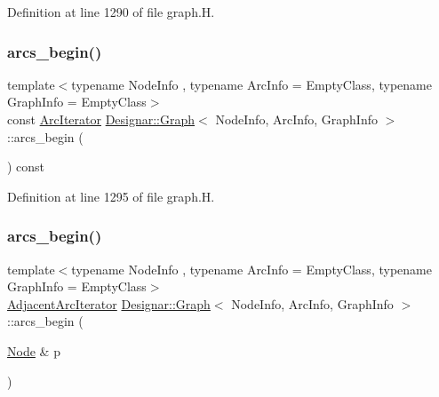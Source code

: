 Definition at line 1290 of file graph.\+H.

\mbox{\label{class_designar_1_1_graph_a3906cae09045bb9c037e1c3c4e64dd97}} 
\subsubsection{\texorpdfstring{arcs\+\_\+begin()}{arcs\_begin()}\hspace{0.1cm}{\footnotesize\ttfamily [2/4]}}
{\footnotesize\ttfamily template$<$typename Node\+Info , typename Arc\+Info  = Empty\+Class, typename Graph\+Info  = Empty\+Class$>$ \\
const \hyperlink{class_designar_1_1_graph_1_1_arc_iterator}{Arc\+Iterator} \hyperlink{class_designar_1_1_graph}{Designar\+::\+Graph}$<$ Node\+Info, Arc\+Info, Graph\+Info $>$\+::arcs\+\_\+begin (\begin{DoxyParamCaption}{ }\end{DoxyParamCaption}) const\hspace{0.3cm}{\ttfamily [inline]}}



Definition at line 1295 of file graph.\+H.

\mbox{\label{class_designar_1_1_graph_a9488f4193d227a690f46e91a11dd830a}} 
\subsubsection{\texorpdfstring{arcs\+\_\+begin()}{arcs\_begin()}\hspace{0.1cm}{\footnotesize\ttfamily [3/4]}}
{\footnotesize\ttfamily template$<$typename Node\+Info , typename Arc\+Info  = Empty\+Class, typename Graph\+Info  = Empty\+Class$>$ \\
\hyperlink{class_designar_1_1_graph_1_1_adjacent_arc_iterator}{Adjacent\+Arc\+Iterator} \hyperlink{class_designar_1_1_graph}{Designar\+::\+Graph}$<$ Node\+Info, Arc\+Info, Graph\+Info $>$\+::arcs\+\_\+begin (\begin{DoxyParamCaption}\item[{\hyperlink{class_designar_1_1_graph_a5dfc7dba9d092ac489c72e40390c37d0}{Node} \&}]{p }\end{DoxyParamCaption})\hspace{0.3cm}{\ttfamily [inline]}}



